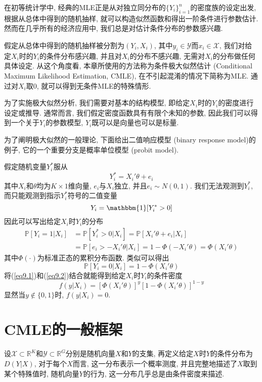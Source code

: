 \documentclass[cn, 12pt, math=mtpro2, bibstyle=apa, blue, twocol]{elegantbook}
\newcommand{\R}{\mathbb{R}}
\newcommand{\PP}{\mathbb{P}}
\begin{document}
在初等统计学中, 经典的MLE正是从对独立同分布的$\{Y_i\}_{i=1}^n$的密度族的设定出发, 根据从总体中得到的随机抽样, 就可以构造似然函数和得出一阶条件进行参数估计. 然而在几乎所有的经济应用中, 我们总是对估计条件分布的参数感兴趣.

假定从总体中得到的随机抽样被分割为$(Y_i,X_i)$, 其中$y_i\in\mathscr{Y}$而$x_i\in\mathscr{X}$, 我们对给定$X_i$时的$Y_i$的条件分布感兴趣, 并且对$X_i$的分布不感兴趣, 无需对$X_i$的分布做任何具体设定. 从这个角度看, 本章所使用的方法称为条件极大似然估计 (Conditional Maximum Likelihood Estimation, CMLE), 在不引起混淆的情况下简称为MLE. 通过对$X_i$取0, 就可以得到无条件MLE的特殊情形.

为了实施极大似然分析, 我们需要对基本的结构模型, 即给定$X_i$时的$Y_i$的密度进行设定或推导. 通常而言, 我们假定密度函数具有有限个未知的参数, 因此我们可以得到一个关于$Y_i$的参数模型, $Y_i$既可以是向量也可以是标量.

为了阐明极大似然的一般理论, 下面给出二值响应模型 (binary response model)的例子, 它的一个重要分支是概率单位模型 (probit model).
\begin{example}
假定随机变量$Y_i^\ast$服从
$$Y_i^\ast=X_i'\theta+e_i$$
其中$X_i$和$\theta$均为$K\times1$维向量, $e_i$与$X_i$独立, 并且$e_i\sim N(0,1)$. 我们无法观测到$Y_i^\ast$, 而只能观测到指示$Y_i^\ast$符号的二值变量
$$Y_i=\mathbbm{1}[Y_i^\ast>0]$$
因此可以写出给定$X_i$时$Y_i$的分布
\begin{align}
\PP[Y_i=1|X_i]&=\PP[Y_i^\ast>0|X_i]=\PP[X_i'\theta+e_i|X_i]  \nonumber \\
&=\PP[e_i>-X_i'\theta|X_i]=1-\Phi(-X_i'\theta)=\Phi(X_i'\theta) \label{eq9.1}
\end{align}
其中$\Phi(\cdot)$为标准正态的累积分布函数. 类似可以得出
\begin{equation}\label{eq9.2}
  \PP[Y_i=0|X_i]=1-\Phi(X_i'\theta)
\end{equation}
将(\ref{eq9.1})和(\ref{eq9.2})结合就能得到给定$X_i$时$Y_i$的条件密度
$$f(y|X_i)=[\Phi(X_i'\theta)]^y[1-\Phi(X_i'\theta)]^{1-y}$$
显然当$y\notin\{0,1\}$时, $f(y|X_i)=0$.
\end{example}

\section{CMLE的一般框架}
设$\mathscr{X}\subset\R^K$和$\mathscr{Y}\subset\R^G$分别是随机向量$X$和$Y$的支集, 再定义给定$X$时$Y$的条件分布为$D(Y|X)$, 对于每个$X$而言, 这一分布表示一个概率测度, 并且完整地描述了$X$取到某个特殊值时, 随机向量$Y$的行为, 这一分布几乎总是由条件密度来描述.
\end{document}
